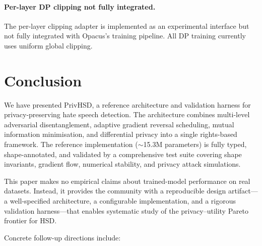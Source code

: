 \documentclass{article}
\begin{document}
\paragraph{Per-layer DP clipping not fully integrated.}
The per-layer clipping adapter is implemented as an experimental
interface but not fully integrated with Opacus's training pipeline.
All DP training currently uses uniform global clipping.


\section{Conclusion}
\label{sec:conclusion}

We have presented PrivHSD, a reference architecture and validation
harness for privacy-preserving hate speech detection. The architecture
combines multi-level adversarial disentanglement, adaptive gradient
reversal scheduling, mutual information minimisation, and differential
privacy into a single rights-based framework. The reference
implementation ($\sim$15.3M parameters) is fully typed, shape-annotated,
and validated by a comprehensive test suite covering shape invariants,
gradient flow, numerical stability, and privacy attack simulations.

This paper makes no empirical claims about trained-model performance on
real datasets. Instead, it provides the community with a reproducible
design artifact---a well-specified architecture, a configurable
implementation, and a rigorous validation harness---that enables
systematic study of the privacy--utility Pareto frontier for HSD.

Concrete follow-up directions include:
\end{document}
